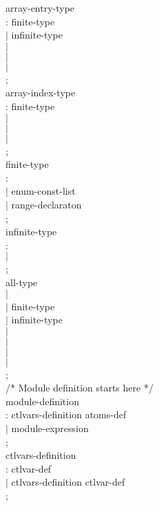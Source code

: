 \begin{tab}
\begin{tabbing}
array-entry-type \\
\>:   finite-type \\
\>$|$ infinite-type \\
\>$|$ \ENUMID \\
\>$|$ \RANGEID \\
\>$|$ \BITVECID \\
\>;\\

array-index-type \\
\>:   finite-type \\
\>$|$ \ENUMID \\
\>$|$ \RANGEID \\
\>$|$ \BITVECID \\
\>;\\

finite-type \\
\>: \BOOL \\
\>$|$ enum-const-list \\
\>$|$ range-declaraton \\
\>;\\

infinite-type \\
\>: \INT \\
\>$|$ \NAT \\
\>;\\

all-type \\
\>$|$ \EVENT \\
\>$|$ finite-type \\
\>$|$ infinite-type \\
\>$|$ \ENUMID \\
\>$|$ \BITVECID \\
\>$|$ \ARRAYID \\
\>$|$ \RANGEID \\
\>;\\



/* Module definition starts here */ \\

module-definition \\
\>: \MODULE \MODULEID ctlvars-definition atoms-def \ENDMODULE \\
\>$|$ \MODULEID \ASSIGN module-expression \\
\>; \\

ctlvars-definition \\
\>: ctlvar-def \\
\>$|$ ctlvars-definition ctlvar-def \\
\>; \\


\end{tabbing}
\end{tab}
